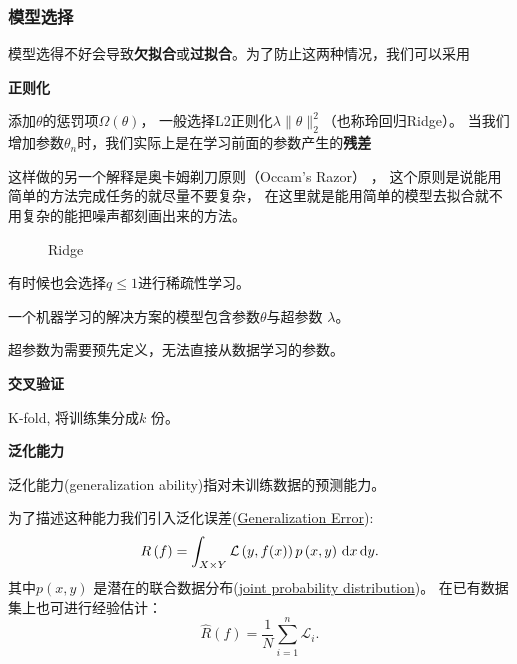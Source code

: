 	\subsubsection{模型选择}
	模型选得不好会导致\textbf{欠拟合}或\textbf{过拟合}。为了防止这两种情况，我们可以采用
	
\noindent \textbf{正则化}

	添加$\theta$的惩罚项$\Omega\left( \theta \right)$， 一般选择L2正则化$\lambda \|\theta\|^2_{2}$（也称玲回归Ridge）。
	当我们增加参数$\theta_n$时，我们实际上是在学习前面的参数产生的\textbf{残差}

	这样做的另一个解释是奥卡姆剃刀原则（Occam’s Razor） ，
	这个原则是说能用简单的方法完成任务的就尽量不要复杂，
	在这里就是能用简单的模型去拟合就不用复杂的能把噪声都刻画出来的方法。

\begin{figure}[ht]
    \centering
    \caption{Ridge}
    \label{fig:ridge}
\end{figure}
	有时候也会选择$q\le 1$进行稀疏性学习。

	一个机器学习的解决方案的模型包含参数$\theta$与超参数 $\lambda$。
	\begin{defi}
			超参数为需要预先定义，无法直接从数据学习的参数。
	\end{defi}


\noindent \textbf{交叉验证}

K-fold, 将训练集分成$k$ 份。

\noindent \textbf{泛化能力}
\begin{defi}
泛化能力(generalization ability)指对未训练数据的预测能力。
\end{defi}
为了描述这种能力我们引入泛化误差(\href{https://en.wikipedia.org/wiki/Generalization_error}{Generalization Error}): 
\[
		R\left( f \right) =\int _{X\times Y} \mathcal{L}\left( y,f(x) \right) p\left( x,y \right) \,\mathrm{d} x\,\mathrm{d} y
.\] 
其中$p(x,y)$ 是潜在的联合数据分布(\href{https://en.wikipedia.org/wiki/Joint_probability_distribution}{joint probability distribution})。
在已有数据集上也可进行经验估计：
\[
		\hat{R} \left( f \right) =\frac{1}{N} \sum_{i=1}^{n} \mathcal{L}_{i}
.\] 

